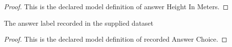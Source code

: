 \begin{proof}
  This is the declared model definition of answer Height In Meters.
\end{proof}
\begin{definition}
  \label{def:physics:phyx-mini-0333:phyxminiproblems-problemphyxmini0333-recordedanswerchoice}
  The answer label recorded in the supplied dataset
\end{definition}
\begin{proof}
  This is the declared model definition of recorded Answer Choice.
\end{proof}
